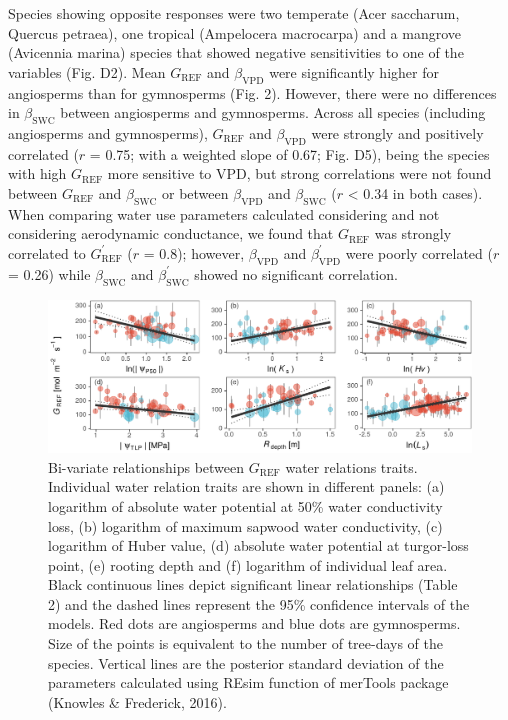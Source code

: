 \documentclass[11pt,twoside]{reedthesis}
\begin{document}
Species showing opposite responses were two temperate (Acer saccharum,
Quercus petraea), one tropical (Ampelocera macrocarpa) and a mangrove
(Avicennia marina) species that showed negative sensitivities to one of
the variables (Fig. D2). Mean \(G_{\text{REF}}\) and
\(\beta_{\text{VPD}}\) were significantly higher for angiosperms than
for gymnosperms (Fig. 2). However, there were no differences in
\(\beta_{\text{SWC}}\) between angiosperms and gymnosperms. Across all
species (including angiosperms and gymnosperms), \(G_{\text{REF}}\) and
\(\beta_{\text{VPD}}\) were strongly and positively correlated (\(r\) =
0.75; with a weighted slope of 0.67; Fig. D5), being the species with
high \(G_{\text{REF}}\) more sensitive to VPD, but strong correlations
were not found between \(G_{\text{REF}}\) and \(\beta_{\text{SWC}}\) or
between \(\beta_{\text{VPD}}\) and \(\beta_{\text{SWC}}\)
(\textbar{}\(r\)\textbar{} \textless{} 0.34 in both cases). When
comparing water use parameters calculated considering and not
considering aerodynamic conductance, we found that \(G_{\text{REF}}\)
was strongly correlated to \(G_{\text{REF}}^{'}\) (\(r\) = 0.8);
however, \(\beta_{\text{VPD}}\) and \(\beta_{\text{VPD}}^{'}\) were
poorly correlated (\(r\) = 0.26) while \(\beta_{\text{SWC}}\) and
\(\beta_{\text{SWC}}^{'}\) showed no significant correlation.\par
\begin{figure}[H]

{\centering \includegraphics[width=1\linewidth]{figure/CH5/Figure_3} 

}

\caption[Bi-variate relationships between $G_{\text{REF}}$ water relations traits.]{Bi-variate relationships between $G_{\text{REF}}$ water relations traits. Individual water relation traits are shown in different panels: (a) logarithm of absolute water potential at 50\% water conductivity loss, (b) logarithm of maximum sapwood water conductivity, (c) logarithm of Huber value, (d) absolute water potential at turgor-loss point, (e) rooting depth and (f) logarithm of individual leaf area. Black continuous lines depict significant linear relationships (Table 2) and the dashed lines represent the 95\% confidence intervals of the models. Red dots are angiosperms and blue dots are gymnosperms. Size of the points is equivalent to the number of tree-days of the species. Vertical lines are the posterior standard deviation of the parameters calculated using REsim function of merTools package (Knowles \& Frederick, 2016).}\label{fig:ch5fig3}
\end{figure}
\end{document}
